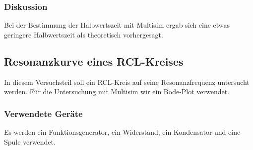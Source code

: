 \documentclass[12pt,a4paper]{article}
\begin{document}
\subsubsection{Diskussion}

Bei der Bestimmung der Halbwertszeit mit Multisim ergab sich eine etwas geringere Halbwertszeit als theoretisch vorhergesagt.

\subsection{Resonanzkurve eines RCL-Kreises}

In diesem Versuchsteil soll ein RCL-Kreis auf seine Resonanzfrequenz untersucht werden. Für die Untersuchung mit Multisim wir ein Bode-Plot verwendet.

\subsubsection{Verwendete Geräte}

Es werden ein Funktionsgenerator, ein Widerstand, ein Kondensator und eine Spule verwendet.
\end{document}
